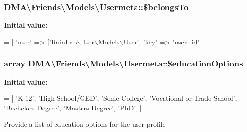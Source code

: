 \subsubsection[{\$belongs\+To}]{\setlength{\rightskip}{0pt plus 5cm}D\+M\+A\textbackslash{}\+Friends\textbackslash{}\+Models\textbackslash{}\+Usermeta\+::\$belongs\+To}\label{classDMA_1_1Friends_1_1Models_1_1Usermeta_a93ae6777a48086374de412273d1d092e}
{\bfseries Initial value\+:}
\begin{DoxyCode}
= [
        \textcolor{stringliteral}{'user'} => [\textcolor{stringliteral}{'RainLab\(\backslash\)User\(\backslash\)Models\(\backslash\)User'},
            \textcolor{stringliteral}{'key'} => \textcolor{stringliteral}{'user\_id'}
\end{DoxyCode}
\hypertarget{classDMA_1_1Friends_1_1Models_1_1Usermeta_a2d958b56be7414a58e8db11ce8b636ae}{}
\subsubsection[{\$education\+Options}]{\setlength{\rightskip}{0pt plus 5cm}array D\+M\+A\textbackslash{}\+Friends\textbackslash{}\+Models\textbackslash{}\+Usermeta\+::\$education\+Options\hspace{0.3cm}{\ttfamily [static]}}\label{classDMA_1_1Friends_1_1Models_1_1Usermeta_a2d958b56be7414a58e8db11ce8b636ae}
{\bfseries Initial value\+:}
\begin{DoxyCode}
= [
        \textcolor{stringliteral}{'K-12'},
        \textcolor{stringliteral}{'High School/GED'},
        \textcolor{stringliteral}{'Some College'},
        \textcolor{stringliteral}{'Vocational or Trade School'},
        \textcolor{stringliteral}{'Bachelors Degree'},
        \textcolor{stringliteral}{'Masters Degree'},
        \textcolor{stringliteral}{'PhD'},
    ]
\end{DoxyCode}
Provide a list of education options for the user profile \hypertarget{classDMA_1_1Friends_1_1Models_1_1Usermeta_a1dca0217848634cab6e2ad205804e351}{}
